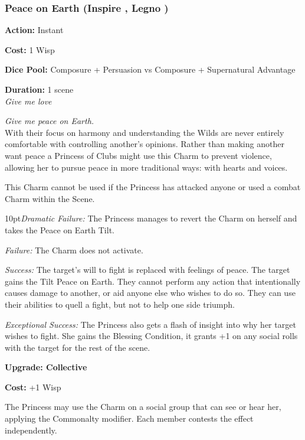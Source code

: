 \subsubsection*{Peace on Earth (Inspire \textbullet\textbullet\textbullet, Legno \textbullet\textbullet)}

\noindent \textbf{Action:} Instant

\noindent \textbf{Cost:} 1 Wisp

\noindent \textbf{Dice Pool:} Composure + Persuasion vs Composure + Supernatural Advantage

\noindent \textbf{Duration:} 1 scene \\

\noindent \textit{Give me love}

\textit{Give me peace on Earth.} \\

\noindent With their focus on harmony and understanding the Wilds are never entirely comfortable with controlling another's opinions. Rather than making another want peace a Princess of Clubs might use this Charm to prevent violence, allowing her to pursue peace in more traditional ways: with hearts and voices.

This Charm cannot be used if the Princess has attacked anyone or used a combat Charm within the Scene.

   \begin{myindentpar}{10pt}\emph{Dramatic Failure:} The Princess manages to revert the Charm on herself and takes the Peace on Earth Tilt.

    \emph{Failure:} The Charm does not activate.

    \emph{Success:} The target's will to fight is replaced with feelings of peace. The target gains the Tilt Peace on Earth. They cannot perform any action that intentionally causes damage to another, or aid anyone else who wishes to do so. They can use their abilities to quell a fight, but not to help one side triumph. 

    \emph{Exceptional Success:} The Princess also gets a flash of insight into why her target wishes to fight. She gains the Blessing Condition, it grants +1 on any social rolls with the target for the rest of the scene.

\textbf{Upgrade: Collective}

\noindent \textbf{Cost:} +1 Wisp

The Princess may use the Charm on a social group that can see or hear her, applying the Commonalty modifier. Each member contests the effect independently.\end{myindentpar}

